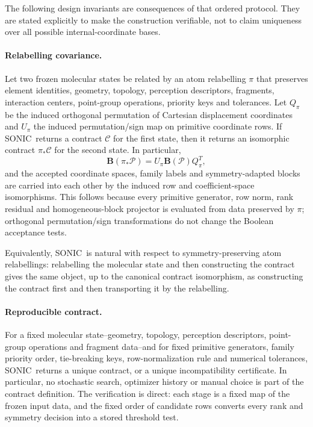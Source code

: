 \documentclass[journal=jctcce,manuscript=article,layout=traditional]{achemso}
\newcommand{\SONIC}{SONIC}
\newcommand{\Bmat}{\mathbf{B}}
\theoremstyle{definition}
\begin{document}
The following design invariants are consequences of that ordered protocol.
They are stated explicitly to make the construction verifiable, not to claim
uniqueness over all possible internal-coordinate bases.

\paragraph{Relabelling covariance.}
\label{thm:relabel}
Let two frozen molecular states be related by an atom relabelling \(\pi\) that
preserves element identities, geometry, topology, perception descriptors, fragments,
interaction centers, point-group operations, priority keys and tolerances.  Let
\(Q_\pi\) be the induced orthogonal permutation of Cartesian displacement
coordinates and \(U_\pi\) the induced permutation/sign map on primitive
coordinate rows.  If \SONIC\ returns a contract \(\mathcal{C}\) for the first
state, then it returns an isomorphic contract \(\pi_*\mathcal{C}\) for the
second state.  In particular,
\[
  \Bmat(\pi_*\mathcal{P})
  =
  U_\pi \Bmat(\mathcal{P}) Q_\pi^T,
\]
and the accepted coordinate spaces, family labels and symmetry-adapted blocks
are carried into each other by the induced row and coefficient-space
isomorphisms.
This follows because every primitive generator, row norm, rank residual and
homogeneous-block projector is evaluated from data preserved by \(\pi\);
orthogonal permutation/sign transformations do not change the Boolean
acceptance tests.

Equivalently, \SONIC\ is natural with respect to symmetry-preserving atom
relabellings: relabelling the molecular state and then constructing the
contract gives the same object, up to the canonical contract isomorphism, as
constructing the contract first and then transporting it by the relabelling.

\paragraph{Reproducible contract.}
\label{prop:determinism}
For a fixed molecular state--geometry, topology, perception descriptors, point-group
operations and fragment data--and for fixed primitive generators, family
priority order, tie-breaking keys, row-normalization rule and numerical
tolerances, \SONIC\ returns a unique contract, or a unique
incompatibility certificate.  In particular, no stochastic search, optimizer
history or manual choice is part of the contract definition.
The verification is direct: each stage is a fixed map of the frozen
input data, and the fixed order of candidate rows converts every rank and
symmetry decision into a stored threshold test.
\end{document}
